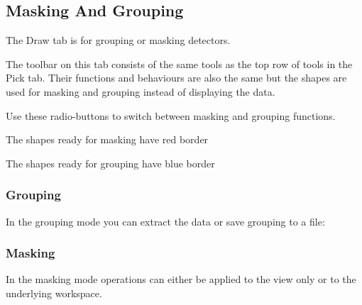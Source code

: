 \documentclass[letterpaper,10pt,english,openany]{sphinxmanual}
\begin{document}
\subsection{Masking And Grouping}
\label{\detokenize{mantid_basic_course/connecting_data_to_instruments/04_masking_and_grouping:masking-and-grouping}}\label{\detokenize{mantid_basic_course/connecting_data_to_instruments/04_masking_and_grouping:id1}}\label{\detokenize{mantid_basic_course/connecting_data_to_instruments/04_masking_and_grouping::doc}}
The Draw tab is for grouping or masking detectors.

The toolbar on this tab consists of the same tools as the top row of
tools in the Pick tab. Their functions and behaviours are also the same
but the shapes are used for masking and grouping instead of displaying
the data.

\begin{figure}[H]
\centering

\noindent{}
\end{figure}

Use these radio-buttons to switch between masking and grouping
functions.

\begin{figure}[H]
\centering

\noindent{}
\end{figure}

The shapes ready for masking have red border


The shapes ready for grouping have blue border



\subsubsection{Grouping}
\label{\detokenize{mantid_basic_course/connecting_data_to_instruments/04_masking_and_grouping:grouping}}
In the grouping mode you can extract the data or save grouping to a
file:

\begin{figure}[H]
\centering

\noindent{}
\end{figure}


\subsubsection{Masking}
\label{\detokenize{mantid_basic_course/connecting_data_to_instruments/04_masking_and_grouping:masking}}
In the masking mode operations can either be applied to the view only or
to the underlying workspace.
\end{document}

